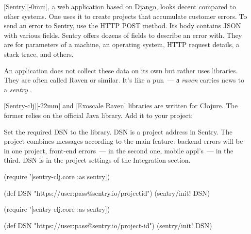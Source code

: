 
[Sentry][-0mm], a web application based on Django, looks decent compared to other systems. One uses it to create projects that accumulate customer errors. To send an error to Sentry, use the HTTP POST method. Its body contains JSON with various fields. Sentry offers dozens of fields to describe an error with. They are for parameters of a machine, an operating system, HTTP request details, a stack trace, and others.


An application does not collect these data on its own but rather uses libraries. They are often called Raven or similar. It's like a pun~--- а \emph{raven} carries news to a \emph{ sentry }.

[Sentry-clj][-22mm] and [Exoscale Raven] libraries are written for Clojure. The former relies on the official Java library. Add it to your project:

\begin{english}
  \begin{clojure}
  \end{clojure}
\end{english}


Set the required DSN to the library. DSN is a project address in Sentry. The project combines messages according to the main feature: backend errors will be in one project, front-end errors~--- in the second one, mobile appl's~--- in the third. DSN is in the project settings of the Integration section.

\ifx\DEVICETYPE\MOBILE

\begin{english}
  \begin{clojure}
(require '[sentry-clj.core :as sentry])

(def DSN
 "https://user:pass@sentry.io/projectid")
(sentry/init! DSN)
  \end{clojure}
\end{english}

\else

\begin{english}
  \begin{clojure}
(require '[sentry-clj.core :as sentry])

(def DSN "https://user:pass@sentry.io/project-id")
(sentry/init! DSN)
  \end{clojure}
\end{english}

